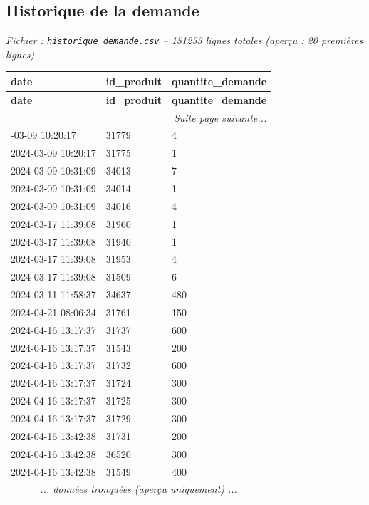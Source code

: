\documentclass[a4paper,11pt]{article}
\begin{document}
\newpage

\subsection{Historique de la demande}

\textit{Fichier : \texttt{historique\_demande.csv} -- 151233 lignes totales
 (aperçu : 20 premières lignes)
}


\scriptsize
\begin{longtable}{|l|l|l|}
\hline
\rowcolor{headerblue}
\textbf{date} & \textbf{id\_produit} & \textbf{quantite\_demande} \\ \hline
\endfirsthead
\hline
\rowcolor{headerblue}
\textbf{date} & \textbf{id\_produit} & \textbf{quantite\_demande} \\ \hline
\endhead
\hline \multicolumn{3}{|r|}{\textit{Suite page suivante...}} \\ \hline
\endfoot
\hline
\endlastfoot
 2024-03-09 10:20:17 & 31779 & 4 \\ \hline
\rowcolor{rowgray} 2024-03-09 10:20:17 & 31775 & 1 \\ \hline
 2024-03-09 10:31:09 & 34013 & 7 \\ \hline
\rowcolor{rowgray} 2024-03-09 10:31:09 & 34014 & 1 \\ \hline
 2024-03-09 10:31:09 & 34016 & 4 \\ \hline
\rowcolor{rowgray} 2024-03-17 11:39:08 & 31960 & 1 \\ \hline
 2024-03-17 11:39:08 & 31940 & 1 \\ \hline
\rowcolor{rowgray} 2024-03-17 11:39:08 & 31953 & 4 \\ \hline
 2024-03-17 11:39:08 & 31509 & 6 \\ \hline
\rowcolor{rowgray} 2024-03-11 11:58:37 & 34637 & 480 \\ \hline
 2024-04-21 08:06:34 & 31761 & 150 \\ \hline
\rowcolor{rowgray} 2024-04-16 13:17:37 & 31737 & 600 \\ \hline
 2024-04-16 13:17:37 & 31543 & 200 \\ \hline
\rowcolor{rowgray} 2024-04-16 13:17:37 & 31732 & 600 \\ \hline
 2024-04-16 13:17:37 & 31724 & 300 \\ \hline
\rowcolor{rowgray} 2024-04-16 13:17:37 & 31725 & 300 \\ \hline
 2024-04-16 13:17:37 & 31729 & 300 \\ \hline
\rowcolor{rowgray} 2024-04-16 13:42:38 & 31731 & 200 \\ \hline
 2024-04-16 13:42:38 & 36520 & 300 \\ \hline
\rowcolor{rowgray} 2024-04-16 13:42:38 & 31549 & 400 \\ \hline
\multicolumn{3}{|c|}{\textit{... données tronquées (aperçu uniquement) ...}} \\ \hline
\end{longtable}
\normalsize
\end{document}
